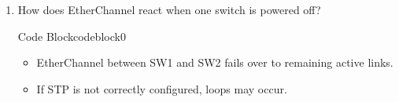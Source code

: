 \documentclass[a4paper]{article}
\begin{document}
\begin{enumerate}
\begin{ocg}{Code Block}{codeblock}{0}
		      \vspace{0.5cm}
	      \end{ocg}
	\item How does EtherChannel react when one switch is powered off?



	      \begin{ocg}{Code Block}{codeblock}{0}

		      \vspace{0.5cm}

		      \begin{tcolorbox}
			      \begin{itemize}
				      \item EtherChannel between SW1 and SW2 fails over to remaining active links.
				      \item If STP is not correctly configured, loops may occur.
			      \end{itemize}

		      \end{tcolorbox}


		      \vspace{0.5cm}
	      \end{ocg}
\end{enumerate}
\end{document}
